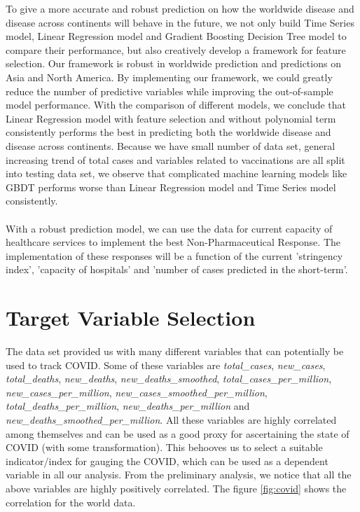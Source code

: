 \documentclass{article}
\begin{document}
To give a more accurate and robust prediction on how the worldwide disease and disease across continents will behave in the future, we not only build Time Series model, Linear Regression model and Gradient Boosting Decision Tree model to compare their performance, but also creatively develop a framework for feature selection. Our framework is robust in worldwide prediction and predictions on Asia and North America. By implementing our framework, we could greatly reduce the number of predictive variables while improving the out-of-sample model performance. With the comparison of different models, we conclude that Linear Regression model with feature selection and without polynomial term consistently performs the best in predicting both the worldwide disease and disease across continents. Because we have small number of data set, general increasing trend of total cases and variables related to vaccinations are all split into testing data set, we observe that complicated machine learning models like GBDT performs worse than Linear Regression model and Time Series model consistently.\\
\\
With a robust prediction model, we can use the data for current capacity of healthcare services to implement the best Non-Pharmaceutical Response. The implementation of these responses will be a function of the current 'stringency index', 'capacity of hospitals' and 'number of cases predicted in the short-term'. 

\section{Target Variable Selection}
The data set provided us with many different variables that can potentially be used to track COVID. Some of these variables are \textit{total\_cases}, \textit{new\_cases}, \textit{total\_deaths}, \textit{new\_deaths}, \textit{new\_deaths\_smoothed}, \textit{total\_cases\_per\_million}, \textit{new\_cases\_per\_million}, \textit{new\_cases\_smoothed\_per\_million}, \textit{total\_deaths\_per\_million}, \textit{new\_deaths\_per\_million} and \textit{new\_deaths\_smoothed\_per\_million}. All these variables are highly correlated among themselves and can be used as a good proxy for ascertaining the state of COVID (with some transformation). This behooves us to select a suitable indicator/index for gauging the COVID, which can be used as a dependent variable in all our analysis. From the preliminary analysis, we notice that all the above variables are highly positively correlated. The figure \ref{fig:covid} shows the correlation for the world data. 
\end{document}
